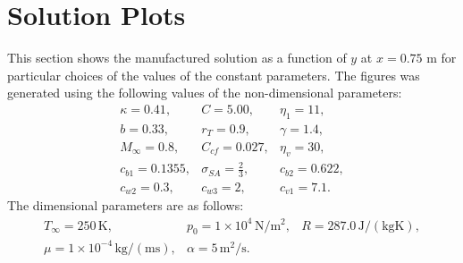 % 
% 
% 

%
\section{Solution Plots} \label{sec:soln_plots}
This section shows the manufactured solution as a function of $y$ at
$x=0.75$ m for particular choices of the values of the constant
parameters.  The figures was generated using the
following values of the non-dimensional parameters:
%
\begin{equation*}
\begin{array}{ccc}
\kappa = 0.41, & C    =  5.00, & \eta_1 = 11, \\
b = 0.33, & r_T = 0.9, & \gamma = 1.4, \\
M_{\infty} = 0.8, & C_{cf} = 0.027, & \eta_v = 30, \\
c_{b1} = 0.1355, & \sigma_{SA} = \frac{2}{3}, & c_{b2} = 0.622, \\
c_{w2} = 0.3, & c_{w3} = 2, & c_{v1} = 7.1.
\end{array}
\end{equation*}
%
The dimensional parameters are as follows:
%
\begin{equation*}
\begin{array}{ccc}
T_{\infty} = 250 \, \mathrm{K}, & p_0 = 1 \times 10^4 \, \mathrm{N/m^2}, & R = 287.0 \, \mathrm{J/(kg K)}, \\
\mu = 1 \times 10^{-4} \, \mathrm{kg/(m s)}, & \alpha = 5 \, \mathrm{m^2/s}. & 
\end{array}
\end{equation*}
%

